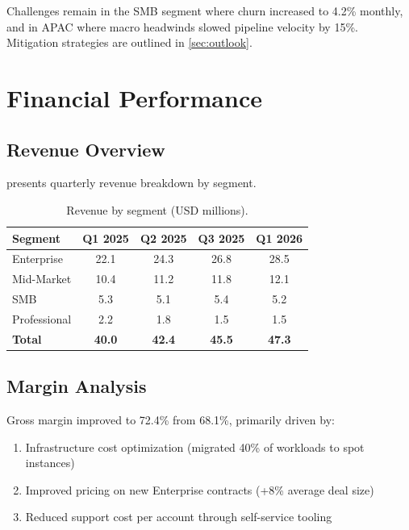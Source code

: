 \documentclass[11pt,a4paper]{article}
\begin{document}
Challenges remain in the SMB segment where churn increased to 4.2\% monthly, and in APAC where macro headwinds slowed pipeline velocity by 15\%. Mitigation strategies are outlined in \cref{sec:outlook}.

\section{Financial Performance}
\label{sec:financials}

\subsection{Revenue Overview}

 presents quarterly revenue breakdown by segment.

\begin{table}[htbp]
    \centering
    \caption{Revenue by segment (USD millions).}
    \label{tbl:revenue}
    \begin{tabular}{l S S S S}
        \toprule
        Segment & {Q1 2025} & {Q2 2025} & {Q3 2025} & {Q1 2026} \\
        \midrule
        Enterprise   & 22.1 & 24.3 & 26.8 & 28.5 \\
        Mid-Market   & 10.4 & 11.2 & 11.8 & 12.1 \\
        SMB          &  5.3 &  5.1 &  5.4 &  5.2 \\
        Professional &  2.2 &  1.8 &  1.5 &  1.5 \\
        \midrule
        \textbf{Total} & \bfseries 40.0 & \bfseries 42.4 & \bfseries 45.5 & \bfseries 47.3 \\
        \bottomrule
    \end{tabular}
\end{table}

\subsection{Margin Analysis}

Gross margin improved to 72.4\% from 68.1\%, primarily driven by:

\begin{enumerate}
    \item Infrastructure cost optimization (migrated 40\% of workloads to spot instances)
    \item Improved pricing on new Enterprise contracts (+8\% average deal size)
    \item Reduced support cost per account through self-service tooling
\end{enumerate}
\end{document}
